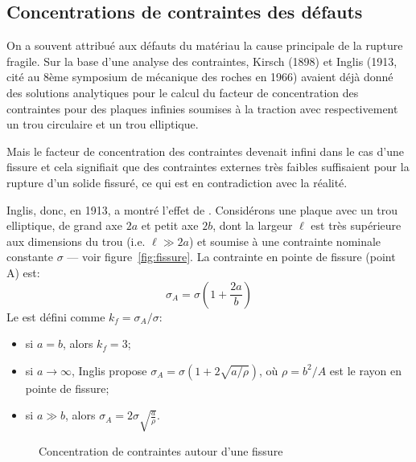 \subsection{Concentrations de contraintes des défauts}
\begin{histoire}%
On a souvent attribué aux défauts du matériau la cause principale de la rupture fragile.
Sur la base d'une analyse des contraintes, Kirsch (1898) et
Inglis (1913, cité au 8ème symposium  de mécanique des roches en 1966)
avaient déjà donné des solutions analytiques pour le calcul du facteur de concentration des
contraintes pour des plaques infinies soumises à la traction avec respectivement un trou circulaire
et un trou elliptique.

\medskip
Mais le facteur de concentration des contraintes devenait infini dans le cas d'une fissure et cela signifiait
que des contraintes externes très faibles suffisaient pour la rupture d'un solide fissuré, ce qui est en
contradiction avec la réalité.
\end{histoire}

\medskip
Inglis, donc, en 1913, a montré l'effet de .
\medskipvm
Considérons une plaque avec un trou elliptique, de grand axe $2a$ et petit axe $2b$, dont la largeur $\ell$ est très supérieure aux dimensions du trou (i.e. $\ell\gg 2a$) et soumise à une contrainte nominale constante
$\sigma$ --- voir figure~\ref{fig:fissure}.
La contrainte en pointe de fissure (point A) est:
\begin{equation} \sigma_A = \sigma \left( 1+\frac{2a}b\right) \end{equation}
Le  est défini comme $k_f = \sigma_A/\sigma$:
\begin{itemize}
   \item si $a=b$, alors $k_f=3$;
   \item si $a\rightarrow\infty$, Inglis propose $\sigma_A=\sigma (1+2\sqrt{a/\rho})$,
	où $\rho=b^2/A$ est le rayon en pointe de fissure;
   \item si $a\gg b$, alors $\sigma_A=2\sigma \sqrt{\frac{a}{\rho}}$.
\end{itemize}
\begin{figure}[ht]\centering
{}\hspace{7em}
\caption{Concentration de contraintes autour d'une fissure}
\end{figure}
